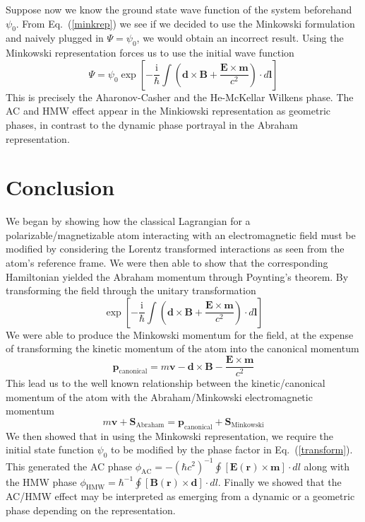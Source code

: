 Suppose now we know the ground state wave function of the system beforehand $\psi_0$. From Eq.\ (\ref{minkrep}) we see if we decided to use the Minkowski formulation and naively plugged in $\Psi=\psi_0$, we would obtain an incorrect result.  Using the Minkowski representation forces us to use the initial wave function 
\begin{equation}
\Psi=\psi_0\exp{\left[-\frac{\mathrm{i}}{\mathrm{\hbar}}\int \left(\mathbf{d}\times\mathbf{B}+\frac{\mathbf{E}\times\mathbf{m}}{c^2}\right)\cdot d\mathbf{l}\right]}
\end{equation}
This is precisely the Aharonov-Casher and the He-McKellar Wilkens phase.  The AC and HMW effect appear in the Minkiowski representation as geometric phases, in contrast to the dynamic phase portrayal in the Abraham representation.   

\section{Conclusion}
\label{conclusion}

We began by showing how the classical Lagrangian for a polarizable/magnetizable atom interacting with an electromagnetic field must be modified by considering the Lorentz transformed interactions as seen from the atom's reference frame.  We were then able to show that the corresponding Hamiltonian yielded the Abraham momentum through Poynting's theorem. By transforming the field through the unitary transformation
\begin{equation}
\exp{\left[-\frac{\mathrm{i}}{\mathrm{\hbar}}\int\left(\mathbf{d}\times\mathbf{B}+\frac{\mathbf{E}\times\mathbf{m}}{c^2}\right)\cdot d\mathbf{l}\right]}
\label{transform}
\end{equation}
We were able to produce the Minkowski momentum for the field, at the expense of transforming the kinetic momentum of the atom into the canonical momentum
\begin{equation}
\mathbf{p}_{\mathrm{canonical}}=m\mathbf{v}- \mathbf{d}\times\mathbf{B}-\frac{\mathbf{E}\times\mathbf{m}}{c^2}
\label{canonical}
\end{equation}
This lead us to the well known relationship between the kinetic/canonical momentum of the atom with the Abraham/Minkowski electromagnetic momentum 
\begin{equation}
m\mathbf{v}+\mathbf{S}_{\mathrm{Abraham}}=\mathbf{p}_{\mathrm{canonical}}+\mathbf{S}_{\mathrm{Minkowski}}
\end{equation}
We then showed that in using the Minkowski representation, we require the initial state function $\psi_0$ to be modified by the phase factor in Eq.\ (\ref{transform}). This generated the AC phase $\phi_{\mathrm{AC}} = -(\hbar c^2)^{-1} \oint [\mathbf{E}(\mathbf{r}) \times \mathbf{m}] \cdot dl $ along with the HMW phase $\phi_{\mathrm{HMW}} = \hbar^{-1} \oint [\mathbf{B}(\mathbf{r}) \times \mathbf {d}] \cdot dl $.  
Finally we showed that the AC/HMW effect may be interpreted as emerging from a dynamic or a geometric phase depending on the representation.




